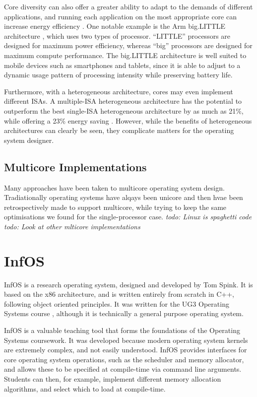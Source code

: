 \documentclass[bsc,frontabs,twoside,singlespacing,parskip,deptreport]{infthesis}     %
\begin{document}
Core diversity can also offer a greater ability to adapt to the demands of different applications, and running each application on the most appropriate core can increase energy efficiency \cite{kumar_2003}. One notable example is the Arm big.LITTLE architecture \cite{big.little}, which uses two types of processor. “LITTLE” processors are designed for maximum power efficiency, whereas “big” processors are designed for maximum compute performance. The big.LITTLE architecture is well suited to mobile devices such as smartphones and tablets, since it is able to adjust to a dynamic usage pattern of processing intensity while preserving battery life.

Furthermore, with a heterogeneous architecture, cores may even implement different ISAs. A multiple-ISA heterogeneous architecture has the potential to outperform the best single-ISA heterogeneous architecture by as much as 21\%, while offering a 23\% energy saving \cite{venkat_2014}. However, while the benefits of heterogeneous architectures can clearly be seen, they complicate matters for the operating system designer.

\subsection{Multicore Implementations} \label{multicore-implementations}
Many approaches have been taken to multicore operating system design. Tradiationally operating systems have alqays been unicore and then hvae been retrospectively made to support multicore, while trying to keep the same optimisations we found for the single-processor case.
\textit{todo: Linux is spaghetti code}
\textit{todo: Look at other mlticore implementations}

\section{InfOS} \label{InfOS-introduction}
InfOS \cite{infos} is a research operating system, designed and developed by Tom Spink. It is based on the x86 architecture, and is written entirely from scratch in C++, following object oriented principles. It was written for the UG3 Operating Systems course \cite{ug3os}, although it is technically a general purpose operating system.

InfOS is a valuable teaching tool that forms the foundations of the Operating Systems coursework. It was developed because modern operating system kernels are extremely complex, and not easily understood. InfOS provides interfaces for core operating system operations, such as the scheduler and memory allocator, and allows these to be specified at compile-time via command line arguments. Students can then, for example, implement different memory allocation algorithms, and select which to load at compile-time.
\end{document}
